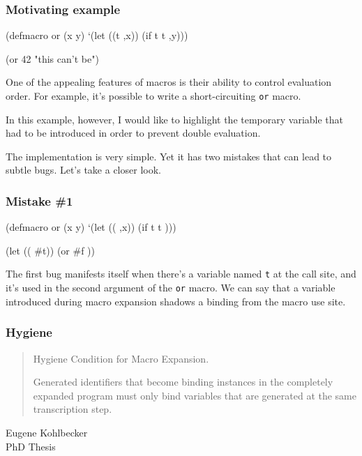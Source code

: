 \documentclass[hyperref={bookmarks=false}]{beamer}
\begin{document}
\begin{frame}[fragile]
\frametitle{Motivating example}

\begin{lstlistinglike}
\begin{semiverbatim}
(defmacro or (x y)
  `(let ((t ,x))
     (if t t ,y)))

(or 42 "this can't be")
\end{semiverbatim}
\end{lstlistinglike}

One of the appealing features of macros is their ability to
control evaluation order. For example, it's possible to write
a short-circuiting \texttt{or} macro.

In this example, however, I would like to highlight the temporary variable
that had to be introduced in order to prevent double evaluation.

The implementation is very simple. Yet it has two mistakes
that can lead to subtle bugs. Let's take a closer look.
\end{frame}

\begin{frame}[fragile]
\frametitle{Mistake \#1}

\begin{lstlistinglike}
\begin{semiverbatim}
(defmacro or (x y)
  `(let ((\text{\color{red}{t}} ,x))
     (if t t \text{\color{red}{,y}})))

(let ((\text{\color{blue}{t}} \#t))
  (or \#f \text{\color{red}{t}}))
\end{semiverbatim}
\end{lstlistinglike}

The first bug manifests itself when there's a variable named \texttt{t} at the call site,
and it's used in the second argument of the \texttt{or} macro. We can say that a variable introduced during macro expansion shadows a binding from the macro use site.
\end{frame}

\begin{frame}[fragile]
\frametitle{Hygiene}

\begin{quote}
Hygiene Condition for Macro Expansion.

Generated identifiers that become binding instances in
the completely expanded program must only bind variables
that are generated at the same transcription step.
\end{quote}

\begin{flushright}
\textemdash Eugene Kohlbecker\\
PhD Thesis
\end{flushright}
\end{frame}
\end{document}
